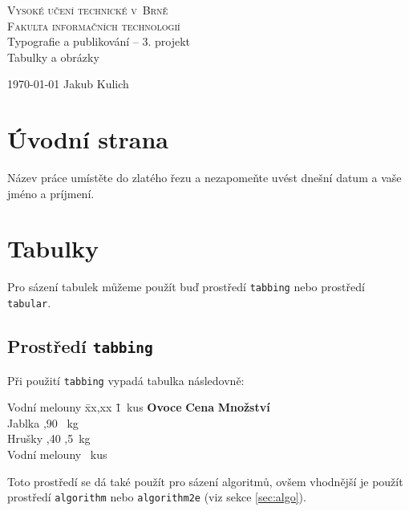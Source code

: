 \documentclass[11pt,a4paper]{article}
\begin{document}
\begin{titlepage}
\begin{center}
\Huge
\textsc{
    Vysoké učení technické v~Brně \\ [-.25em]
    \huge Fakulta informačních technologií}\\
\LARGE
Typografie a publikování -- 3. projekt \\ [-.25em]
\Huge Tabulky a obrázky \\

{\Large \today \hfill
Jakub Kulich}
\end{center}
\end{titlepage}

\section{Úvodní strana}
Název práce umístěte do zlatého řezu a nezapomeňte uvést dnešní datum a vaše jméno a príjmení.

\section{Tabulky}
Pro sázení tabulek můžeme použít buď prostředí \texttt{tabbing} nebo prostředí \texttt{tabular}.
\subsection{Prostředí \texttt{tabbing}}
Při použití \texttt{tabbing} vypadá tabulka následovně:
\begin{tabbing}
    Vodní melouny \quad \= xx,xx  \quad \= 1~kus \kill
    \textbf{Ovoce} \> \textbf{Cena} \> \textbf{Množství} \\
    Jablka ,90 ~kg \\
    Hrušky ,40 ,5~kg \\
    Vodní melouny  ~kus \\
\end{tabbing}

\noindent
Toto prostředí se dá také použít pro sázení algoritmů, ovšem vhodnější je použít 
prostředí \texttt{algorithm} nebo \texttt{algorithm2e} (viz sekce \ref{sec:algo}).
\end{document}
